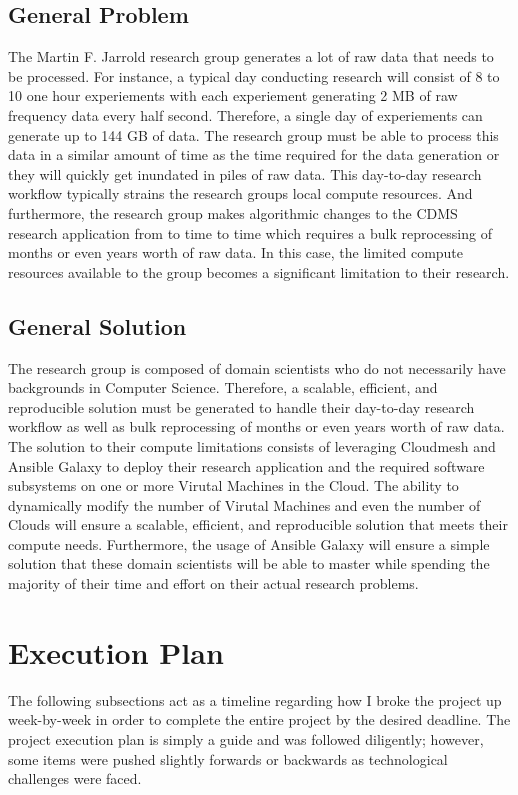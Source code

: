 \documentclass[9pt,twocolumn,twoside]{../../styles/osajnl}
\begin{document}
\subsection{General Problem} \label{problem}
The Martin F. Jarrold research group generates a lot of raw data that
needs to be processed. For instance, a typical day conducting research
will consist of 8 to 10 one hour experiements with each experiement
generating 2 MB of raw frequency data every half second. Therefore, a
single day of experiements can generate up to 144 GB of data. The
research group must be able to process this data in a similar amount
of time as the time required for the data generation or they will
quickly get inundated in piles of raw data. This day-to-day research
workflow typically strains the research groups local compute
resources. And furthermore, the research group makes algorithmic
changes to the CDMS research application from to time to time which
requires a bulk reprocessing of months or even years worth of raw
data. In this case, the limited compute resources available to the
group becomes a significant limitation to their research.

\subsection{General Solution} \label{solution}
The research group is composed of domain scientists who do not
necessarily have backgrounds in Computer Science. Therefore, a
scalable, efficient, and reproducible solution must be generated to
handle their day-to-day research workflow as well as bulk reprocessing
of months or even years worth of raw data. The solution to their
compute limitations consists of leveraging Cloudmesh and Ansible
Galaxy to deploy their research application and the required software
subsystems on one or more Virutal Machines in the Cloud. The ability
to dynamically modify the number of Virutal Machines and even the
number of Clouds will ensure a scalable, efficient, and reproducible
solution that meets their compute needs. Furthermore, the usage of
Ansible Galaxy will ensure a simple solution that these domain
scientists will be able to master while spending the majority of their
time and effort on their actual research problems.

\section{Execution Plan} \label{plan}
The following subsections act as a timeline regarding how I broke the
project up week-by-week in order to complete the entire project by the
desired deadline. The project execution plan is simply a guide and was
followed diligently; however, some items were pushed slightly
forwards or backwards as technological challenges were faced.
\end{document}
